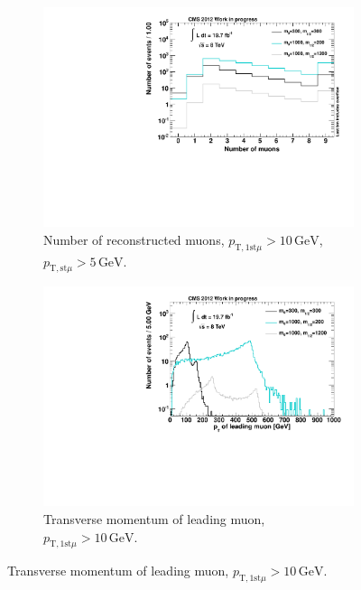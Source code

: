 \begin{figure}[!htbp]
  \centering
  \begin{subfigure}[b]{0.495\textwidth}
    \centering
    \includegraphics[width=\textwidth]{plots/muo_n.pdf}
    \caption{Number of reconstructed muons, $p_{\text{T}, 1\text{st} \mu} > 10\,\text{GeV}$, $p_{\text{T}, \text{st} \mu} > 5\,\text{GeV}$.\label{fig:muo_n}}
  \end{subfigure}
  \begin{subfigure}[b]{0.495\textwidth}
    \centering
    \includegraphics[width=\textwidth]{plots/sig_muo_pt1.pdf}
    \caption{Transverse momentum of leading muon, $p_{\text{T}, 1\text{st} \mu} > 10\,\text{GeV}$.\label{fig:sig_muo_pt1}}
  \end{subfigure}
\end{figure}

